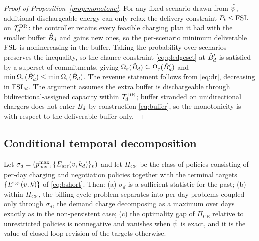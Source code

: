 \begin{proof}[Proof of Proposition~\ref{prop:monotone}]
For any fixed scenario drawn from $\hat{\psi}$, additional dischargeable
energy can only relax the delivery constraint $P_{t} \le \mathrm{FSL}$ on
$\mathcal{T}^{\mathrm{DR}}_{d}$: the controller retains every feasible charging plan it had
with the smaller buffer $\hat{B}_{d}$ and gains new ones, so the
per-scenario minimum deliverable $\mathrm{FSL}$ is nonincreasing in the buffer.
Taking the probability over scenarios preserves the inequality, so the
chance constraint \eqref{eq:pledgeset} at $\hat{B}_{d}'$ is satisfied
by a superset of commitments, giving $\Omega_{\varepsilon}(\hat{B}_{d}) \subseteq
\Omega_{\varepsilon}(\hat{B}_{d}')$ and $\min\Omega_{\varepsilon}(\hat{B}_{d}') \le
\min\Omega_{\varepsilon}(\hat{B}_{d})$. The revenue statement follows from
\eqref{eq:dr}, decreasing in $\mathrm{FSL}_d$. The argument assumes the extra
buffer is dischargeable through bidirectional-assigned capacity within
$\mathcal{T}^{\mathrm{DR}}_{d}$; buffer stranded on unidirectional chargers does not enter
$B_{d}$ by construction \eqref{eq:buffer}, so the monotonicity is
with respect to the deliverable buffer only.
\end{proof}

\subsection{Conditional temporal decomposition}

\begin{theorem}\label{thm:decomp}
Let $\sigma_d = (p^{\max}_{\mathrm{past}}, \{E_{\mathrm{arr}}(v,k_d)\}_{v})$ and let
$\Pi_{\mathrm{CE}}$ be the class of policies consisting of per-day
charging and negotiation policies together with the terminal targets
$\{E^{\mathrm{tgt}}(v,k)\}$ of \eqref{eq:bshort}. Then: (a) $\sigma_d$ is a
sufficient statistic for the past; (b) within $\Pi_{\mathrm{CE}}$, the
billing-cycle problem separates into per-day problems coupled only
through $\sigma_d$, the demand charge decomposing as a maximum over
days exactly as in the non-persistent case; (c) the optimality gap of
$\Pi_{\mathrm{CE}}$ relative to unrestricted policies is nonnegative
and vanishes when $\hat{\psi}$ is exact, and it is the value of closed-loop
revision of the targets otherwise.
\end{theorem}

